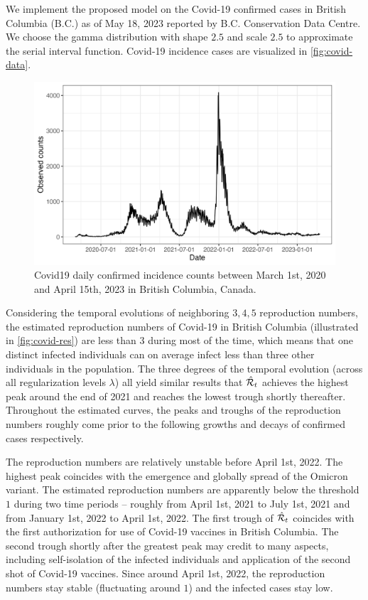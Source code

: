 We implement the proposed model on the Covid-19 confirmed cases in British Columbia (B.C.) as of May 18, 2023 reported by B.C. Conservation Data Centre. We choose the gamma distribution with shape $2.5$ and scale $2.5$ to approximate the serial interval function. Covid-19 incidence cases are visualized in \autoref{fig:covid-data}.
\begin{figure}[tb]
    \centering
    \includegraphics[width=0.99\linewidth]{fig/covid_dat.png}
    \caption{Covid19 daily confirmed incidence counts between March 1st, 2020 and April 15th, 2023 in British Columbia, Canada.} 
    \label{fig:covid-data}
\end{figure} 

Considering the temporal evolutions of neighboring $3, 4, 5$ reproduction numbers, the estimated reproduction numbers of Covid-19 in British Columbia (illustrated in \autoref{fig:covid-res}) are less than $3$ during most of the time, which means that one distinct infected individuals can on average infect less than three other individuals in the population. The three degrees of the temporal evolution (across all regularization levels $\lambda$) all yield similar results that $\hat{\mathcal{R}}_t$ achieves the highest peak around the end of 2021 and reaches the lowest trough shortly thereafter. Throughout the estimated curves, the peaks and troughs of the reproduction numbers roughly come prior to the following growths and decays of confirmed cases respectively.

The reproduction numbers are relatively unstable before April 1st, 2022. The highest peak coincides with the emergence and globally spread of the Omicron variant. The estimated reproduction numbers are apparently below the threshold $1$ during two time periods -- roughly from April 1st, 2021 to July 1st, 2021 and from January 1st, 2022 to April 1st, 2022. The first trough of $\hat{\mathcal{R}}_t$ coincides with the first authorization for use of Covid-19 vaccines in British Columbia. The second trough shortly after the greatest peak may credit to many aspects, including self-isolation of the infected individuals and application of the second shot of Covid-19 vaccines. Since around April 1st, 2022, the reproduction numbers stay stable (fluctuating around $1$) and the infected cases stay low. 


